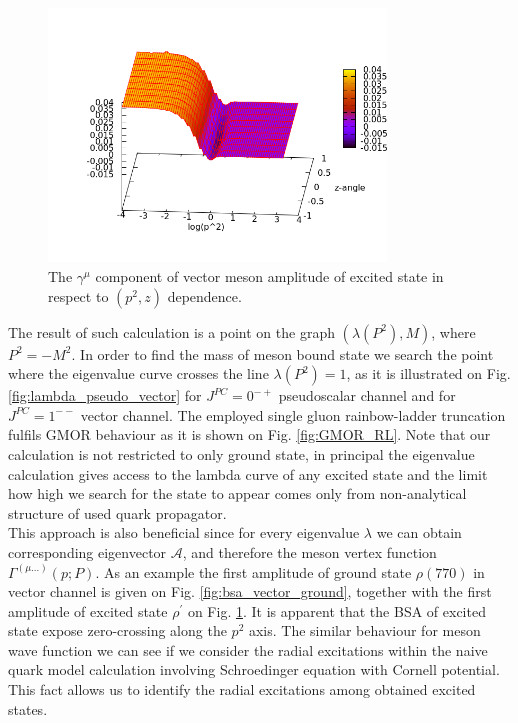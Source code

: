\begin{figure}[H]
\begin{center}
\includegraphics[width=0.80\textwidth]{figures/bsa_vector_excited} 
\caption{\footnotesize The $\gamma^\mu$ component of vector meson \BS amplitude of excited state in respect to $(p^2,z)$ dependence.}\label{fig:bsa_vector_excited}
\end{center}
\end{figure} 
The result of such calculation is a point on the graph $(\lambda(P^2),M)$, where $P^2 = - M^2$. In order to find the mass of meson bound state we search the point where the eigenvalue curve crosses the line $\lambda(P^2)=1$, as it is illustrated on Fig. \ref{fig:lambda_pseudo_vector} for $J^{PC} = 0^{-+}$ pseudoscalar channel and for $J^{PC} = 1^{--}$ vector channel. The employed single gluon rainbow-ladder truncation fulfils GMOR behaviour as it is shown on Fig. \ref{fig:GMOR_RL}. Note that our calculation is not restricted to only ground state, in principal the eigenvalue calculation gives access to the lambda curve of any excited state and the limit how high we search for the state to appear comes only from non-analytical structure of used quark propagator. \\ 

This approach is also beneficial since for every eigenvalue $\lambda$ we can obtain corresponding eigenvector $\mathcal{A}$, and therefore the meson vertex function $\Gamma^{(\mu...)}(p;P)$. As an example the first amplitude of ground state $\rho(770)$ in vector channel is given on Fig. \ref{fig:bsa_vector_ground}, together with the first amplitude of excited state $\rho^\prime$ on Fig. \ref{fig:bsa_vector_excited}. It is apparent that the BSA of excited state expose zero-crossing along the $p^2$ axis. The similar behaviour for meson wave function we can see if we consider the radial excitations within the naive quark model calculation involving Schroedinger equation with Cornell potential. This fact allows us to identify the radial excitations among obtained excited states.
%

